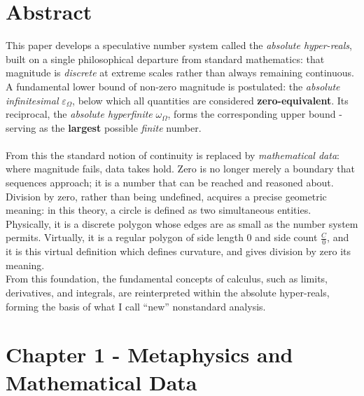 \documentclass{article}
\begin{document}
\newpage\section*{Abstract}
This paper develops a speculative number system called the \emph{absolute 
hyper-reals}, built on a single philosophical departure from standard 
mathematics: that magnitude is \textit{discrete} at extreme scales rather than always remaining continuous. A 
fundamental lower bound of non-zero magnitude is postulated: the 
\emph{absolute infinitesimal} $\varepsilon_\Omega$, below which all 
quantities are considered \textbf{zero-equivalent}. Its reciprocal, the 
\emph{absolute hyperfinite} $\omega_\Omega$, forms the corresponding upper 
bound - serving as the \textbf{largest} possible \textit{finite} number.\\\\ From this the standard notion of 
continuity is replaced by \textit{mathematical data}: where magnitude 
fails, data takes hold. Zero is no longer merely a boundary that sequences 
approach; it is a number that can be reached and reasoned about. Division by zero, rather than being undefined, acquires a precise geometric 
meaning: in this theory, a circle is defined as two simultaneous entities. 
Physically, it is a discrete polygon whose edges are as small as the number 
system permits. Virtually, it is a regular polygon of side length $0$ and 
side count $\frac{C}{0}$, and it is this virtual definition which defines 
curvature, and gives division by zero its meaning.
\\From this foundation, the fundamental concepts of calculus, such as limits, 
derivatives, and integrals, are reinterpreted within the absolute 
hyper-reals, forming the basis of what I call ``new'' nonstandard analysis.
\newpage
\section{Chapter 1 - Metaphysics and Mathematical Data}
\end{document}
